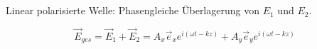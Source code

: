 \documentclass{report}
\begin{document}
\chapter{}

\chapter{}

\chapter{}

\section{}

\section{}

\section{}

\subsection{}

Linear polarisierte Welle: Phasengleiche \"Uberlagerung von $E_1$ und $E_2$.

$$\vec E_{ges}=\vec E_1 + \vec E_2 = A_x\vec e_x e^{i(\omega t-kz)}+A_y\vec e_y e^{i(\omega t-kz)}$$

\subsection{}

\section{}

\section{}
\end{document}
